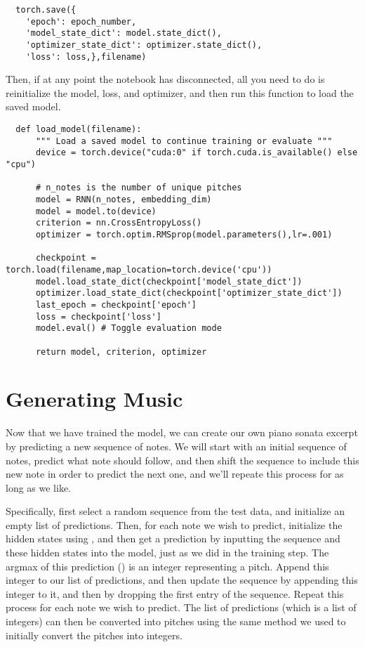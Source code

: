 \begin{problem}
\begin{warn}
\begin{lstlisting}
  torch.save({
    'epoch': epoch_number,
    'model_state_dict': model.state_dict(),
    'optimizer_state_dict': optimizer.state_dict(),
    'loss': loss,},filename)
\end{lstlisting}

Then, if at any point the notebook has disconnected, all you need to do is reinitialize the model, loss, and optimizer, and then run this function to load the saved model.
\begin{lstlisting}
  def load_model(filename):
      """ Load a saved model to continue training or evaluate """
      device = torch.device("cuda:0" if torch.cuda.is_available() else "cpu")
  
      # n_notes is the number of unique pitches
      model = RNN(n_notes, embedding_dim) 
      model = model.to(device)
      criterion = nn.CrossEntropyLoss()
      optimizer = torch.optim.RMSprop(model.parameters(),lr=.001)
  
      checkpoint = torch.load(filename,map_location=torch.device('cpu'))
      model.load_state_dict(checkpoint['model_state_dict'])
      optimizer.load_state_dict(checkpoint['optimizer_state_dict'])
      last_epoch = checkpoint['epoch']
      loss = checkpoint['loss']
      model.eval() # Toggle evaluation mode
      
      return model, criterion, optimizer
  \end{lstlisting}
\end{warn}
\end{problem}

\section*{Generating Music}
Now that we have trained the model, we can create our own piano sonata excerpt by predicting a new sequence of notes.
We will start with an initial sequence of notes, predict what note should follow, and then shift the sequence to include this new note in order to predict the next one, and we'll repeate this process for as long as we like.

Specifically, first select a random sequence from the test data, and initialize an empty list of predictions.
Then, for each note we wish to predict, initialize the hidden states using , and then get a prediction by inputting the sequence and these hidden states into the model, just as we did in the training step.
The argmax of this prediction () is an integer representing a pitch.
Append this integer to our list of predictions, and then update the sequence by appending this integer to it, and then by dropping the first entry of the sequence.
Repeat this process for each note we wish to predict.
The list of predictions (which is a list of integers) can then be converted into pitches using the same method we used to initially convert the pitches into integers.


